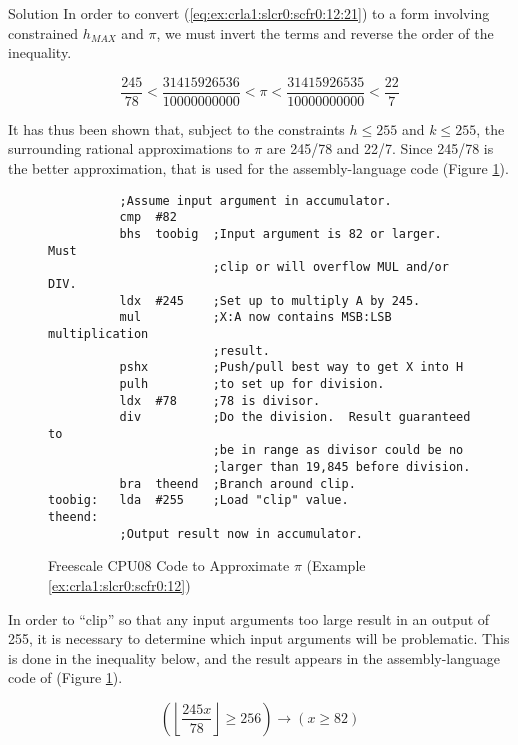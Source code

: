 \begin{vworkexampleparsection}{Solution}
In order to convert (\ref{eq:ex:crla1:slcr0:scfr0:12:21})
to a form involving constrained $h_{MAX}$ and $\pi$, we must 
invert the terms and reverse the order of the inequality.

\begin{equation}
\label{eq:ex:crla1:slcr0:scfr0:12:22}
\frac{245}{78} 
<
\frac{31415926536}{10000000000}
<
\pi
<
\frac{31415926535}{10000000000}
<
\frac{22}{7}
\end{equation}

It has thus been shown that, subject to the constraints
$h \leq 255$ and $k \leq 255$, the surrounding rational approximations
to $\pi$ are 245/78 and 22/7.  Since 245/78 is the better approximation, that
is used for the assembly-language code (Figure \ref{fig:ex:crla1:slcr0:scfr0:12:10}).

\begin{figure}
\begin{verbatim}
          ;Assume input argument in accumulator.
          cmp  #82
          bhs  toobig  ;Input argument is 82 or larger.  Must
                       ;clip or will overflow MUL and/or DIV.
          ldx  #245    ;Set up to multiply A by 245.
          mul          ;X:A now contains MSB:LSB multiplication
                       ;result.
          pshx         ;Push/pull best way to get X into H
          pulh         ;to set up for division.
          ldx  #78     ;78 is divisor.
          div          ;Do the division.  Result guaranteed to
                       ;be in range as divisor could be no
                       ;larger than 19,845 before division.
          bra  theend  ;Branch around clip.
toobig:   lda  #255    ;Load "clip" value.
theend:
          ;Output result now in accumulator.
\end{verbatim}
\caption{Freescale CPU08 Code to Approximate $\pi$ (Example \ref{ex:crla1:slcr0:scfr0:12})}
\label{fig:ex:crla1:slcr0:scfr0:12:10}
\end{figure}

In order to ``clip'' so that any input arguments too large result in an output of 255,
it is necessary to determine which input arguments will be problematic.  This is done
in the inequality below, and the result appears in the assembly-language code of
(Figure \ref{fig:ex:crla1:slcr0:scfr0:12:10}).

\begin{equation}
\label{eq:ex:crla1:slcr0:scfr0:12:23}
\left({\left\lfloor{\frac{245 x}{78}}\right\rfloor 
\geq 256}\right) 
\longrightarrow \left({x \geq 82}\right)
\end{equation}
\end{vworkexampleparsection}
\vworkexamplefooter{}


